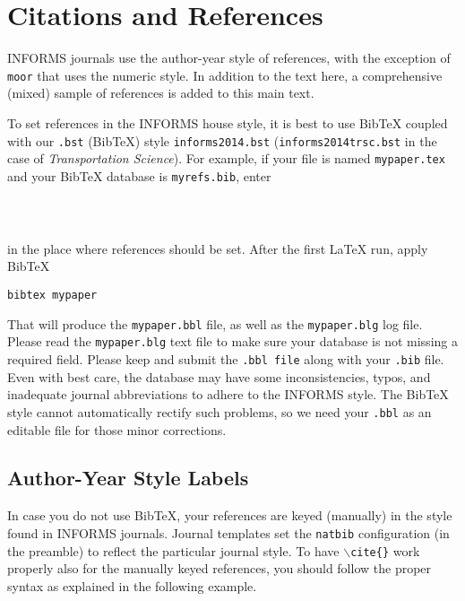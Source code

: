 \documentclass[ijds,nonblindrev]{informs4}
\begin{document}
\section{Citations and References}\label{sec11}

INFORMS journals use the author-year style of references, with the exception 
of \texttt{moor} that uses the numeric style. In addition to the text 
here, a comprehensive (mixed) sample of references is added to this main 
text.

To set references in the INFORMS house style, it is best to use BibTeX 
coupled with our \texttt{.bst} (BibTeX) style
\texttt{informs2014.bst} (\texttt{informs2014trsc.bst} in the case of
{\it Transportation Science}). For example, if your   
file is named \texttt{mypaper.tex} and your BibTeX database is \texttt{myrefs.bib}, enter

\begin{Verbatim}[fontsize=\small]
     
     
\end{Verbatim}

\noindent 
in the place where references should be set. After the first LaTeX run, 
apply BibTeX 

\begin{Verbatim}[fontsize=\small]
     bibtex mypaper
\end{Verbatim}

\noindent 
That will produce the \texttt{mypaper.bbl} file, as well as the
\texttt{mypaper.blg} log file. Please read the \texttt{mypaper.blg} text file to  
make sure your database is not missing a required field. Please keep and 
submit the \texttt{.bbl file} along with your \texttt{.bib} file. Even 
with best care, the database may have some inconsistencies, typos, and 
inadequate journal abbreviations to adhere to the INFORMS style. The BibTeX 
style cannot automatically rectify such problems, so we need your
\texttt{.bbl} as an editable file for those minor corrections. 

\subsection{Author-Year Style Labels}\label{sec11.1}

In case you do not use BibTeX, your references are keyed (manually) in the 
style found in INFORMS journals. Journal templates set the
\texttt{natbib} configuration (in the preamble) to reflect the particular journal style. 
To have \texttt{$\backslash $cite\{\}} work properly also for the 
manually keyed references, you should follow the proper syntax as explained 
in the following example.
\end{document}
